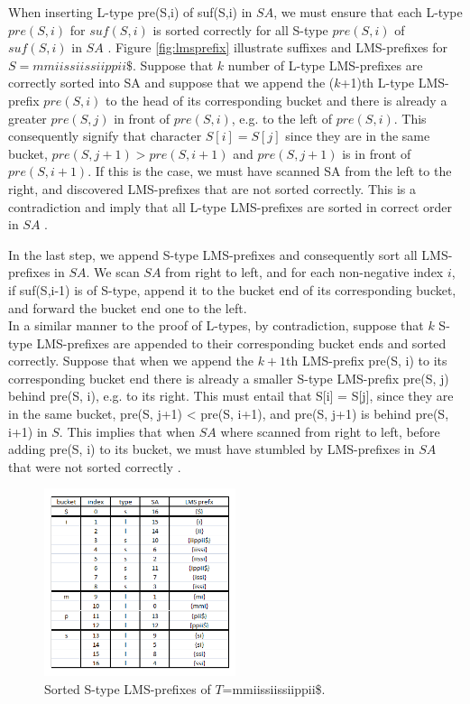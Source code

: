 \documentclass[12pt]{article} %
\begin{document}
When inserting L-type pre(S,i) of suf(S,i) in $SA$, we must ensure that each L-type $pre(S,i)$ for $suf(S,i)$ is sorted correctly for all S-type $pre(S,i)$ of $suf(S,i)$ in $SA$ \cite{twoeffecient}. Figure \ref{fig:lmsprefix} illustrate suffixes and LMS-prefixes for $S=mmiissiissiippii\$$. Suppose that $k$ number of L-type LMS-prefixes are correctly sorted into SA and suppose that we append the ($k$+1)th L-type LMS-prefix $pre(S,i)$ to the head of its corresponding bucket and there is already a greater $pre(S,j)$ in front of $pre(S,i)$, e.g. to the left of $pre(S,i)$. This consequently signify that character $S[i]=S[j]$ since they are in the same bucket, $pre(S, j+1) > pre(S, i+1)$ and $pre(S, j+1)$ is in front of $pre(S, i+1)$. If this is the case, we must have scanned SA from the left to the right, and discovered LMS-prefixes that are not sorted correctly. This is a contradiction and imply that all L-type LMS-prefixes are sorted in correct order in $SA$ \cite{twoeffecient}. 

In the last step, we append S-type LMS-prefixes and consequently sort all LMS-prefixes in $SA$. We scan $SA$ from right to left, and for each non-negative index $i$, if suf(S,i-1) is of S-type, append it to the bucket end of its corresponding bucket, and forward the bucket end one to the left. \\
In a similar manner to the proof of L-types, by contradiction, suppose that $k$ S-type LMS-prefixes are appended to their corresponding bucket ends and sorted correctly. Suppose that when we append the $k+1$th LMS-prefix pre(S, i) to its corresponding bucket end there is already a smaller S-type LMS-prefix pre(S, j) behind pre(S, i), e.g. to its right. This must entail that S[i] = S[j], since they are in the same bucket, pre(S, j+1) < pre(S, i+1), and pre(S, j+1) is behind pre(S, i+1) in $S$. This implies that when $SA$ where scanned from right to left, before adding pre(S, i) to its bucket, we must have stumbled by LMS-prefixes in $SA$ that were not sorted correctly \cite{twoeffecient}.
\begin{figure}[H]
    \centering
    \includegraphics[width=0.5\textwidth]{lmssorteds}
    \captionsetup{width=0.8\textwidth}
    \caption{Sorted S-type LMS-prefixes of  $T$=mmiissiissiippii\$.}
    \label{fig:lmssorteds}  
\end{figure}
\end{document}
